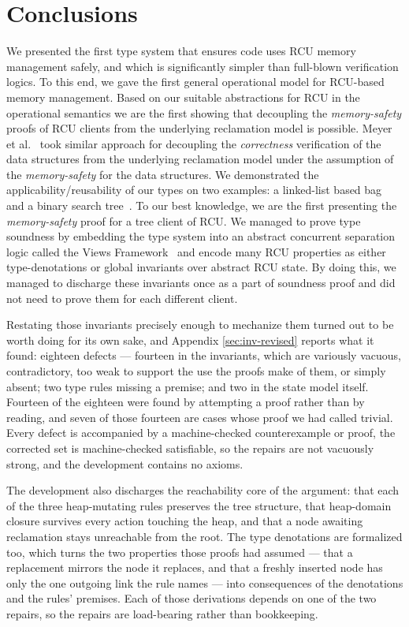 \section{Conclusions}
\label{sec:concls}
We presented the first type system that ensures code uses RCU memory management safely, and which is significantly simpler than full-blown verification logics. To this end, we gave the first general operational model for RCU-based memory management. Based on our suitable abstractions for RCU in the operational semantics we are the first showing that decoupling the \textit{memory-safety} proofs of RCU clients from the underlying reclamation model is possible. Meyer et al.~\cite{myr} took similar approach for decoupling the \textit{correctness} verification of the data structures from the underlying reclamation model under the assumption of the \textit{memory-safety} for the data structures. We demonstrated the applicability/reusability of our types on two examples: a linked-list based bag~\cite{McKenney2015SomeEO} and a binary search tree~\cite{Arbel:2014:CUR:2611462.2611471}. To our best knowledge, we are the first presenting the \textit{memory-safety} proof for a tree client of RCU. We managed to prove type soundness by embedding the type system into an abstract concurrent separation logic called the Views Framework~\cite{views} and encode many RCU properties as either type-denotations or global invariants over abstract RCU state. By doing this, we managed to discharge these invariants once as a part of soundness proof and did not need to prove them for each different client.

 Restating those invariants precisely enough to mechanize them turned out to be worth doing for its own sake, and Appendix \ref{sec:inv-revised} reports what it found: eighteen defects --- fourteen in the invariants, which are variously vacuous, contradictory, too weak to support the use the proofs make of them, or simply absent; two type rules missing a premise; and two in the state model itself.  Fourteen of the eighteen were found by attempting a proof rather than by reading, and seven of those fourteen are cases whose proof we had called trivial.  Every defect is accompanied by a machine-checked counterexample or proof, the corrected set is machine-checked satisfiable, so the repairs are not vacuously strong, and the development contains no axioms.

The development also discharges the reachability core of the argument: that each of the three heap-mutating rules preserves the tree structure, that heap-domain closure survives every action touching the heap, and that a node awaiting reclamation stays unreachable from the root.  The type denotations are formalized too, which turns the two properties those proofs had assumed --- that a replacement mirrors the node it replaces, and that a freshly inserted node has only the one outgoing link the rule names --- into consequences of the denotations and the rules' premises.  Each of those derivations depends on one of the two repairs, so the repairs are load-bearing rather than bookkeeping.


